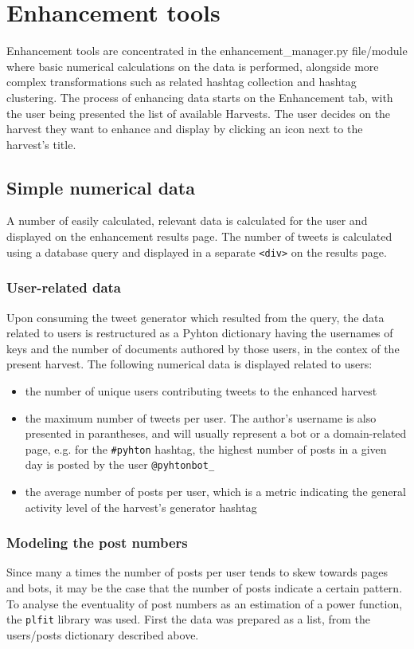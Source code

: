 \section{Enhancement tools}
Enhancement tools are concentrated in the enhancement\_manager.py file/module where basic numerical calculations on the data is performed, alongside more complex transformations such as related hashtag collection and hashtag clustering. The process of enhancing data starts on the Enhancement tab, with the user being presented the list of available Harvests. The user decides on the harvest they want to enhance and display by clicking an icon next to the harvest's title.

\subsection{Simple numerical data}
A number of easily calculated, relevant data is calculated for the user and displayed on the enhancement results page. The number of tweets is calculated using a database query and displayed in a separate \texttt{<div>} on the results page.

\subsubsection{User-related data}
Upon consuming the tweet generator which resulted from the query, the data related to users is restructured as a Pyhton dictionary having the usernames of keys and the number of documents authored by those users, in the contex of the present harvest. The following numerical data is displayed related to users:

\begin{itemize}
\item the number of unique users contributing tweets to the enhanced harvest
\item the maximum number of tweets per user. The author's username is also presented in parantheses, and will usually represent a bot or a domain-related page, e.g. for the \texttt{\#pyhton} hashtag, the highest number of posts in a given day is posted by the user \texttt{@pyhtonbot\_}
\item the average number of posts per user, which is a metric indicating the general activity level of the harvest's generator hashtag
\end{itemize}

\subsubsection{Modeling the post numbers}
Since many a times the number of posts per user tends to skew towards pages and bots, it may be the case that the number of posts indicate a certain pattern. To analyse the eventuality of post numbers as an estimation of a power function, the \texttt{plfit} library was used. First the data was prepared as a list, from the users/posts dictionary described above. 

